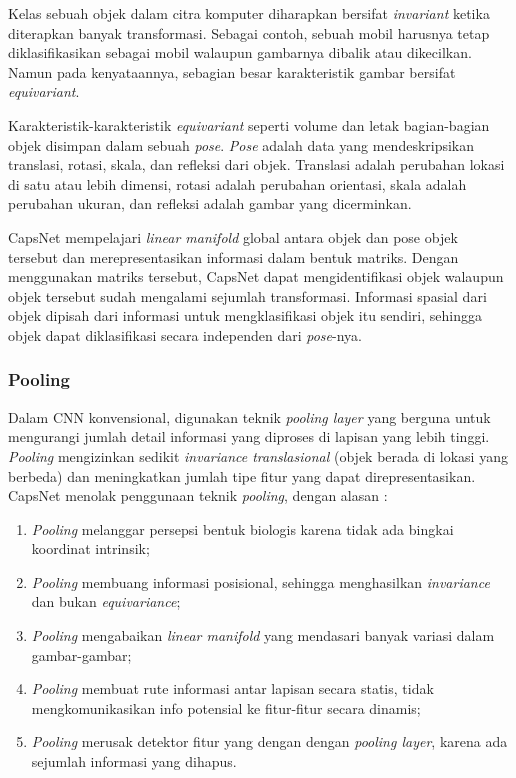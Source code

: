 \documentclass{article}
\begin{document}
	   	\par
	   	Kelas sebuah objek dalam citra komputer diharapkan bersifat \textit{invariant} ketika diterapkan banyak transformasi. Sebagai contoh, sebuah mobil harusnya tetap diklasifikasikan sebagai mobil walaupun gambarnya dibalik atau dikecilkan. Namun pada kenyataannya, sebagian besar karakteristik gambar bersifat \textit{equivariant}. \par
	   	Karakteristik-karakteristik \textit{equivariant} seperti volume dan letak bagian-bagian objek disimpan dalam sebuah \textit{pose}. \textit{Pose} adalah data yang mendeskripsikan translasi, rotasi, skala, dan refleksi dari objek. Translasi adalah perubahan lokasi di satu atau lebih dimensi, rotasi adalah perubahan orientasi, skala adalah perubahan ukuran, dan refleksi adalah gambar yang dicerminkan. \par
	   	CapsNet mempelajari \textit{linear manifold} global antara objek dan pose objek tersebut dan merepresentasikan informasi dalam bentuk matriks. Dengan menggunakan matriks tersebut, CapsNet dapat mengidentifikasi objek walaupun objek tersebut sudah mengalami sejumlah transformasi. Informasi spasial dari objek dipisah dari informasi untuk mengklasifikasi objek itu sendiri, sehingga objek dapat diklasifikasi secara independen dari \textit{pose}-nya.\cite{hinton_2}
	   	
	   	\subsubsection{Pooling}
	   	Dalam CNN konvensional, digunakan teknik \textit{pooling layer} yang berguna untuk mengurangi jumlah detail informasi yang diproses di lapisan yang lebih tinggi. \textit{Pooling} mengizinkan sedikit \textit{invariance translasional} (objek berada di lokasi yang berbeda) dan meningkatkan jumlah tipe fitur yang dapat direpresentasikan. CapsNet menolak penggunaan teknik \textit{pooling}, dengan alasan :
	   	
	   	\begin{enumerate}
	   	 \item \textit{Pooling} melanggar persepsi bentuk biologis karena tidak ada bingkai koordinat intrinsik;
	   	 \item \textit{Pooling} membuang informasi posisional, sehingga menghasilkan \textit{invariance} dan bukan \textit{equivariance};
	   	 \item \textit{Pooling} mengabaikan \textit{linear manifold} yang mendasari banyak variasi dalam gambar-gambar;
	   	 \item \textit{Pooling} membuat rute informasi antar lapisan secara statis, tidak mengkomunikasikan info potensial ke fitur-fitur secara dinamis;
	   	 \item \textit{Pooling} merusak detektor fitur yang dengan dengan \textit{pooling layer}, karena ada sejumlah informasi yang dihapus.
	   	\end{enumerate}
	   	
\end{document}
